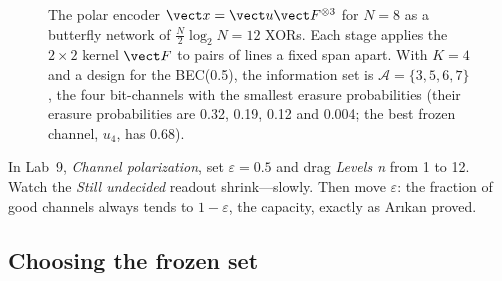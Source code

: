 \begin{figure}[htbp]\centering
{}
\caption{The polar encoder $\vect x=\vect u\vect F^{\otimes3}$ for $N=8$ as a butterfly network of
$\frac N2\log_2N=12$ XORs. Each stage applies the $2\times2$ kernel $\vect F$ to pairs of lines a
fixed span apart. With $K=4$ and a design for the BEC(0.5), the information set is
$\mathcal A=\{3,5,6,7\}$, the four bit-channels with the smallest erasure probabilities
(their erasure probabilities are 0.32, 0.19, 0.12 and 0.004; the best frozen channel, $u_4$, has 0.68).}
\label{fig:ch15_polar_encoder}
\end{figure}

\begin{tryit}
In Lab~9, \emph{Channel polarization}, set $\varepsilon=0.5$ and drag \emph{Levels n} from 1 to
12. Watch the \emph{Still undecided} readout shrink---slowly. Then move $\varepsilon$: the
fraction of good channels always tends to $1-\varepsilon$, the capacity, exactly as Ar\i kan
proved.
\end{tryit}

\subsection{Choosing the frozen set}

